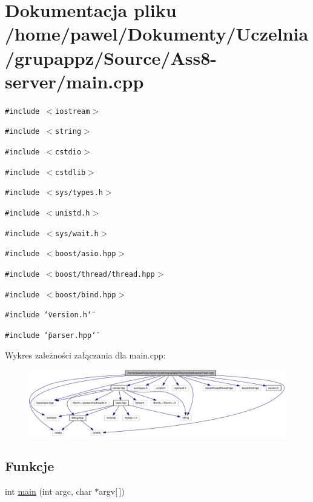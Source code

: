 \hypertarget{a00006}{
\section{Dokumentacja pliku /home/pawel/Dokumenty/Uczelnia/grupappz/Source/Ass8-server/main.cpp}
\label{a00006}
}
{\tt \#include $<$iostream$>$}\par
{\tt \#include $<$string$>$}\par
{\tt \#include $<$cstdio$>$}\par
{\tt \#include $<$cstdlib$>$}\par
{\tt \#include $<$sys/types.h$>$}\par
{\tt \#include $<$unistd.h$>$}\par
{\tt \#include $<$sys/wait.h$>$}\par
{\tt \#include $<$boost/asio.hpp$>$}\par
{\tt \#include $<$boost/thread/thread.hpp$>$}\par
{\tt \#include $<$boost/bind.hpp$>$}\par
{\tt \#include \char`\"{}version.h\char`\"{}}\par
{\tt \#include \char`\"{}parser.hpp\char`\"{}}\par


Wykres zależności załączania dla main.cpp:\nopagebreak
\begin{figure}[H]
\begin{center}
\leavevmode
\includegraphics[width=420pt]{a00027}
\end{center}
\end{figure}
\subsection*{Funkcje}
\begin{CompactItemize}
\item 
int \hyperlink{a00006_0ddf1224851353fc92bfbff6f499fa97}{main} (int argc, char $\ast$argv\mbox{[}$\,$\mbox{]})
\end{CompactItemize}


